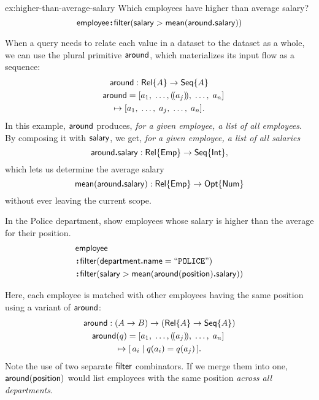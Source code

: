 \begin{demobis}{ex:higher-than-average-salary}
    Which employees have higher than average salary?
    \begin{equation*}
        \mathsf{employee}\!\boldsymbol{:}\!\mathsf{filter}(\mathsf{salary} > \mathsf{mean}(\mathsf{around}\boldsymbol{.}\mathsf{salary}))
    \end{equation*}
\end{demobis}

When a query needs to relate each value in a dataset to the dataset as a whole,
we can use the plural primitive $\mathsf{around}$, which materializes its input flow as
a sequence:
\begin{multline*}
    \Around : \Rel{A} \to \Seq{A} \\
    \shoveleft{\Around = [a_1,\;\ldots,\selected{a_j},\;\ldots,\;a_n]} \\
    \mapsto [a_1,\;\ldots,\;a_j,\;\ldots,\;a_n].
\end{multline*}
In this example, $\mathsf{around}$ produces, \emph{for a given employee, a list of all
employees}.  By composing it with $\mathsf{salary}$, we get, \emph{for a given
employee, a list of all salaries}
\begin{equation*}
    \mathsf{around}\boldsymbol{.}\mathsf{salary} : \mathsf{Rel}{\left\{\mathsf{Emp}\right\}} \to \mathsf{Seq}{\left\{\mathsf{Int}\right\}},
\end{equation*}
which lets us determine the average salary
\begin{equation*}
    \mathsf{mean}(\mathsf{around}\boldsymbol{.}\mathsf{salary}) : \mathsf{Rel}{\left\{\mathsf{Emp}\right\}} \to \mathsf{Opt}{\left\{\mathsf{Num}\right\}}
\end{equation*}
without ever leaving the current scope.

\begin{demo}
    In the Police department, show employees whose salary is higher than the
    average for their position.
    \begin{align*}
        & \mathsf{employee} \\
        & \!\boldsymbol{:}\!\mathsf{filter}(\mathsf{department}\boldsymbol{.}\mathsf{name}=\mathtt{``POLICE"}) \\
        & \!\boldsymbol{:}\!\mathsf{filter}(\mathsf{salary} > \mathsf{mean}(\mathsf{around}(\mathsf{position})\boldsymbol{.}\mathsf{salary}))
    \end{align*}
\end{demo}

Here, each employee is matched with other employees having the same position
using a variant of $\mathsf{around}$:
\begin{multline*}
    \Around : (A \to B) \to (\Rel{A} \to \Seq{A}) \\
    \shoveleft{\Around(q) = [a_1,\;\ldots,\selected{a_j},\;\ldots,\;a_n]} \\
    \mapsto [\,a_i \mid q(a_i)=q(a_j)\,].
\end{multline*}
Note the use of two separate $\mathsf{filter}$ combinators.  If we merge them into one,
$\mathsf{around}(\mathsf{position})$ would list employees with the same position \emph{across
all departments}.

